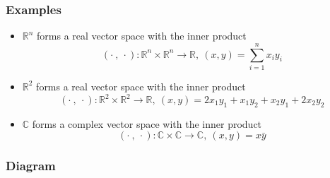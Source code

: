 \documentclass{beamer}
\newcommand{\R}{\mathbb{R}}
\begin{document}
\begin{frame}
    \frametitle{Examples}
    \begin{itemize}
        \item $\mathbb{R}^n$ forms a real vector space with the inner product $$(\cdot~, ~\cdot):\R ^n \times \R^n \to \R ,~ (x,y)=\sum_{i=1}^n x_i y_i $$
        \item $\mathbb{R}^2$ forms a real vector space with the inner product $$(\cdot~, ~\cdot):\R^2 \times \R^2\to \R ,~ (x,y)=2x_1 y_1+x_1 y_2+x_2 y_1+2x_2 y_2$$
        \item $\mathbb{C}$ forms a complex vector space with the inner product $$(\cdot~, ~\cdot):\mathbb{C} \times \mathbb{C}\to \mathbb{C}, ~(x,y)=x \bar{y}$$
    \end{itemize}

\end{frame}

\begin{frame}
    \frametitle{Diagram}
    \begin{figure}
    \end{figure}
    

\end{frame}
\end{document}
